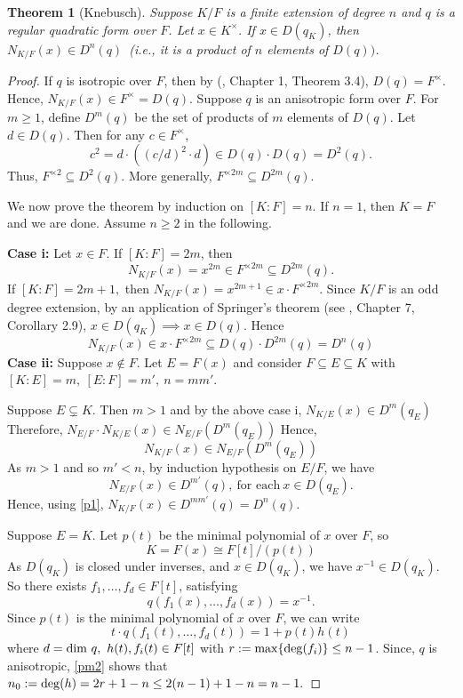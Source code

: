 \documentclass[sn-mathphys-num]{sn-jnl}%
\newtheorem{theorem}{Theorem}[section]
\begin{document}
\begin{theorem} [Knebusch] \label{knebusch norm principle}
Suppose $K/F$ is a finite extension of degree $n$ and $q$ is a regular quadratic form over $F$. Let $x \in K^\times.$ If $x \in D(q_K)$, then $N_{K/F}(x) \in D^n(q)$\ (i.e., it is a product of $n$ elements of $D(q))$.
\end{theorem}
\begin{proof}
If $q$ is isotropic over $F$, then by (\cite{lam}, Chapter 1, Theorem 3.4), $D(q)= F^\times$. Hence, $N_{K/F}(x) \in F^\times = D(q)$.
Suppose $q$ is an anisotropic form over $F$. For $m \geq 1$, define $D^m(q)$ be the set of products of $m$ elements of $D(q)$. Let $d \in D(q)$. Then for any $c \in F^\times$,
 \[c^2= d \cdot ((c/d)^2 \cdot d) \in D(q) \cdot D(q) = D^2(q).\]
 Thus, $F^{\times 2} \subseteq D^2(q)$. More generally, $ F^{\times 2m} \subseteq D^{2m}(q)$. 
 
 We now prove the theorem by induction on $[K:F] = n$. If $n=1$, then $K=F$ and we are done. Assume $n \geq 2 $ in the following.
 
 \textbf{Case i:} Let $x \in  F$. If $[K:F]= 2m$, then %
 \[N_{K/F}(x)=x^{2m} \in F ^{\times 2m} \subseteq D^{2m}(q).\]
 If $[K:F]=2m+1,$ then $N_{K/F}(x)= x^{2m+1} \in x \cdot F^{\times 2m}$. Since $K/F$ is an odd degree extension, by an application of Springer's theorem (see \cite{lam}, Chapter 7, Corollary 2.9), $x \in D(q_K) \implies x \in D(q)$. Hence   \[N_{K/F}(x) \in x \cdot  F^{\times 2m} \subseteq D(q) \cdot D^{2m}(q)=D^n(q)\]
\textbf{Case ii:} Suppose $x \not\in F.$ Let $E=F(x)$ and consider $ F \subseteq E \subseteq K$ with $[K:E]=m,\ [E:F]=m',\ n=mm'.$

Suppose $E \subsetneq K$. Then $m>1$ and by the above case i,
 $N_{K/E}(x) \in D^m(q_E)$ 
 Therefore, $N_{E/F} \cdot  N_{K/E}(x) \in N_{E/F}( D^m(q_E))$
 Hence, \begin{equation} \label{p1}
 N_{K/F}(x) \in N_{E/F}( D^m(q_E)) 
 \end{equation}
As $m> 1$ and so $m'<n$, by induction hypothesis on $E/F$, we have\[ N_{E/F}(x) \in D^{m'}(q),\ \text{for each}\ x \in D(q_E).\] 
Hence, using \ref{p1}, $N_{K/F}(x) \in D^{mm'}(q)=D^n(q)$.

Suppose $E=K$. Let $p(t)$ be the minimal polynomial of $x$ over $F$, so\[
K=F(x) \cong F[t]/(p(t))\]
As $D(q_K)$ is closed under inverses, and $x \in D(q_K)$, we have $x^{-1} \in D(q_K)$.
So there exists $f_1,\dots,f_d \in F[t]$, satisfying \[ q(f_1(x),\dots ,f_d(x)) = x^{-1}.\] 
Since $p(t)$ is the minimal polynomial of $x$ over $F$, we can write
\begin{equation}\label{pm2}
t \cdot q(f_1(t),\dots,f_d(t))= 1+p(t)h(t)
\end{equation}
  where $d= {\rm dim}\ q,\ h(t), f_i(t) \in F[t]$ with $r:= {\rm max} \{{\rm deg}(f_i) \} \leq n-1$. Since, $q$ is anisotropic, \ref{pm2} shows that $n_0:= {\rm deg}(h)=2r+1-n \leq 2(n-1)+1-n = n-1.$


\end{proof}
\end{document}
